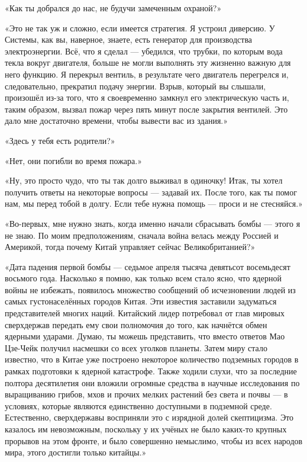 \documentclass[a4paper,12pt]{book}
\begin{document}
\par
«Как ты добрался до нас, не будучи замеченным охраной?»
\par
«Это не так уж и сложно, если имеется стратегия. Я устроил диверсию. У Системы, как вы, наверное, знаете, есть генератор для производства электроэнергии. Всё, что я сделал — убедился, что трубки, по которым вода текла вокруг двигателя, больше не могли выполнять эту жизненно важную для него функцию. Я перекрыл вентиль, в результате чего двигатель перегрелся и, следовательно, прекратил подачу энергии. Взрыв, который вы слышали, произошёл из-за того, что я своевременно замкнул его электрическую часть и, таким образом, вызвал пожар через пять минут после закрытия вентилей. Это дало мне достаточно времени, чтобы вывести вас из здания.»
\par
«Здесь у тебя есть родители?»
\par
«Нет, они погибли во время пожара.»
\par
«Ну, это просто чудо, что ты так долго выживал в одиночку! Итак, ты хотел получить ответы на некоторые вопросы — задавай их. После того, как ты помог нам, мы перед тобой в долгу. Если тебе нужна помощь — проси и не стесняйся.»
\par
«Во-первых, мне нужно знать, когда именно начали сбрасывать бомбы — этого я не знаю. По моим предположениям, сначала война велась между Россией и Америкой, тогда почему Китай управляет сейчас Великобританией?»
\par
«Дата падения первой бомбы — седьмое апреля тысяча девятьсот восемьдесят восьмого года. Насколько я помню, как только всем стало ясно, что ядерной войны не избежать, появилось множество сообщений об исчезновении людей из самых густонаселённых городов Китая. Эти известия заставили задуматься представителей многих наций. Китайский лидер потребовал от глав мировых сверхдержав передать ему свои полномочия до того, как начнётся обмен ядерными ударами. Думаю, ты можешь представить, что вместо ответов Мао Цзе-Чейк получил насмешки со всех уголков планеты. Затем миру стало известно, что в Китае уже построено некоторое количество подземных городов в рамках подготовки к ядерной катастрофе. Также ходили слухи, что за последние полтора десятилетия они вложили огромные средства в научные исследования по выращиванию грибов, мхов и прочих мелких растений без света и почвы — в условиях, которые являются единственно доступными в подземной среде. Естественно, сверхдержавы восприняли это с изрядной долей скептицизма. Это казалось им невозможным, поскольку у их учёных не было каких-то крупных прорывов на этом фронте, и было совершенно немыслимо, чтобы из всех народов мира, этого достигли только китайцы.»
\end{document}
